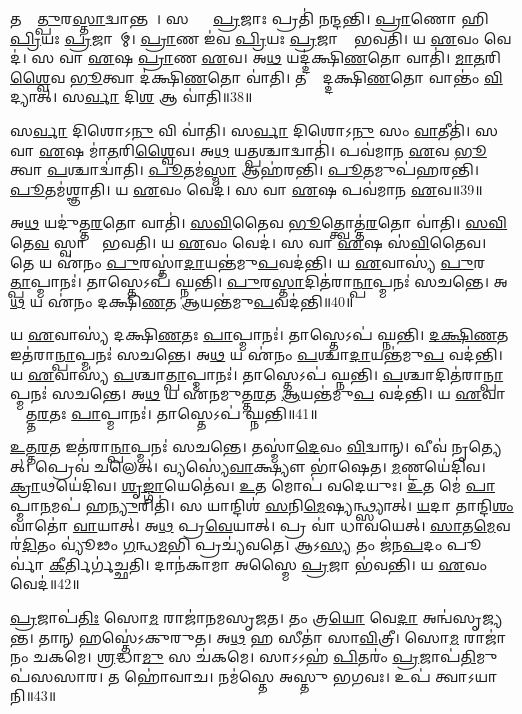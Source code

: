 𑌤𑌸𑍍𑌮𑌾᳚\ul{𑌤𑍍𑌪𑍁}𑌰\ul{𑌸𑍍𑌤𑌾}𑌦𑍍𑌵𑌾𑌨𑍍𑌤𑌮𑍍᳚।
𑌸𑌰𑍍𑌵𑌾𑌃᳚ \ul{𑌪𑍍𑌰}𑌜𑌾𑌃 𑌪𑍍𑌰𑌤𑌿॑ 𑌨𑌨𑍍𑌦𑌨𑍍𑌤𑌿।
\ul{𑌪𑍍𑌰𑌾}𑌣𑍋 𑌹𑌿 \ul{𑌪𑍍𑌰𑌿}𑌯𑌃 \ul{𑌪𑍍𑌰}𑌜𑌾𑌨𑌾᳚𑌮𑍍।
\ul{𑌪𑍍𑌰𑌾}𑌣 𑌇॑𑌵 \ul{𑌪𑍍𑌰𑌿}𑌯𑌃 \ul{𑌪𑍍𑌰}𑌜𑌾𑌨𑌾𑌂᳚ 𑌭𑌵𑌤𑌿।
𑌯 \ul{𑌏}𑌵𑌂 𑌵𑍇𑌦॑।
𑌸 𑌵𑌾 \ul{𑌏}𑌷 \ul{𑌪𑍍𑌰𑌾}𑌣 \ul{𑌏}𑌵।
𑌅\ul{𑌥} 𑌯𑌦𑍍𑌦॑𑌕𑍍𑌷𑌿\ul{𑌣}𑌤𑍋 𑌵𑌾𑌤𑌿॑।
\ul{𑌮𑌾}\ul{𑌤}𑌰𑌿\ul{𑌶𑍍𑌵𑍈}𑌵 \ul{𑌭𑍂}𑌤𑍍𑌵𑌾 𑌦॑𑌕𑍍𑌷𑌿\ul{𑌣}𑌤𑍋 𑌵𑌾॑𑌤𑌿।
𑌤𑌸𑍍𑌮𑌾᳚𑌦𑍍𑌦𑌕𑍍𑌷𑌿\ul{𑌣}𑌤𑍋 𑌵𑌾𑌨𑍍𑌤𑌂॑ \ul{𑌵𑌿}𑌦𑍍𑌯𑌾𑌤𑍍।
𑌸\ul{𑌰𑍍𑌵𑌾} 𑌦𑌿\ul{𑌶} 𑌆 𑌵𑌾॑𑌤𑌿॥38॥

𑌸\ul{𑌰𑍍𑌵𑌾} 𑌦𑌿𑌶𑍋𑌽\ul{𑌨𑍁} 𑌵𑌿 𑌵𑌾॑𑌤𑌿।
𑌸\ul{𑌰𑍍𑌵𑌾} 𑌦𑌿𑌶𑍋𑌽\ul{𑌨𑍁} 𑌸𑌂 \ul{𑌵𑌾}𑌤𑍀𑌤𑌿॑।
𑌸 𑌵𑌾 \ul{𑌏}𑌷 𑌮𑌾॑\ul{𑌤}𑌰𑌿\ul{𑌶𑍍𑌵𑍈}𑌵।
𑌅\ul{𑌥} 𑌯\ul{𑌤𑍍𑌪}𑌶𑍍𑌚𑌾𑌦𑍍𑌵𑌾𑌤𑌿॑।
𑌪𑌵॑𑌮𑌾𑌨 \ul{𑌏}𑌵 \ul{𑌭𑍂}𑌤𑍍𑌵𑌾 \ul{𑌪}𑌶𑍍𑌚𑌾𑌦𑍍𑌵𑌾॑𑌤𑌿।
\ul{𑌪𑍂}𑌤𑌮॑\ul{𑌸𑍍𑌮𑌾} 𑌆𑌹॑𑌰𑌨𑍍𑌤𑌿।
\ul{𑌪𑍂}𑌤𑌮𑍁𑌪॑𑌹𑌰𑌨𑍍𑌤𑌿।
\ul{𑌪𑍂}𑌤𑌮॑𑌶𑍍𑌞𑌾𑌤𑌿।
𑌯 \ul{𑌏}𑌵𑌂 𑌵𑍇𑌦॑।
𑌸 𑌵𑌾 \ul{𑌏}𑌷 𑌪𑌵॑𑌮𑌾𑌨 \ul{𑌏}𑌵॥39॥

𑌅\ul{𑌥} 𑌯𑌦𑍁॑𑌤𑍍𑌤\ul{𑌰}𑌤𑍋 𑌵𑌾𑌤𑌿॑।
\ul{𑌸}\ul{𑌵𑌿}𑌤𑍈𑌵 \ul{𑌭𑍂}𑌤𑍍𑌤𑍍𑌵𑍋𑌤𑍍𑌤॑\ul{𑌰}𑌤𑍋 𑌵𑌾॑𑌤𑌿।
\ul{𑌸}\ul{𑌵𑌿}𑌤𑍇\ul{𑌵} 𑌸𑍍𑌵𑌾𑌨𑌾𑌂᳚ 𑌭𑌵𑌤𑌿।
𑌯 \ul{𑌏}𑌵𑌂 𑌵𑍇𑌦॑।
𑌸 𑌵𑌾 \ul{𑌏}𑌷 𑌸॑\ul{𑌵𑌿}𑌤𑍈𑌵।
𑌤𑍇 𑌯 𑌏॑𑌨𑌂 \ul{𑌪𑍁}𑌰𑌸𑍍𑌤𑌾॑\ul{𑌦𑌾}𑌯𑌨𑍍𑌤॑𑌮𑍁\ul{𑌪}𑌵𑌦॑𑌨𑍍𑌤𑌿।
𑌯 \ul{𑌏}𑌵𑌾𑌸𑍍𑌯॑ \ul{𑌪𑍁}𑌰𑌸𑍍𑌤𑌾᳚\ul{𑌤𑍍𑌪𑌾}𑌪𑍍𑌮𑌾𑌨𑌃॑।
𑌤𑌾𑌸𑍍𑌤𑍇𑌽𑌪॑ 𑌘𑍍𑌨𑌨𑍍𑌤𑌿।
\ul{𑌪𑍁}𑌰\ul{𑌸𑍍𑌤𑌾}𑌦𑌿𑌤॑𑌰𑌾\ul{𑌨𑍍𑌪𑌾}𑌪𑍍𑌮𑌨𑌃॑ 𑌸𑌚𑌨𑍍𑌤𑍇।
𑌅\ul{𑌥} 𑌯 𑌏॑𑌨𑌂 𑌦𑌕𑍍𑌷𑌿\ul{𑌣}𑌤 \ul{𑌆}𑌯𑌨𑍍𑌤॑𑌮𑍁\ul{𑌪}𑌵𑌦॑𑌨𑍍𑌤𑌿॥40॥

𑌯 \ul{𑌏}𑌵𑌾𑌸𑍍𑌯॑ 𑌦𑌕𑍍𑌷𑌿\ul{𑌣}𑌤𑌃 \ul{𑌪𑌾}𑌪𑍍𑌮𑌾𑌨𑌃॑।
𑌤𑌾𑌸𑍍𑌤𑍇𑌽𑌪॑ 𑌘𑍍𑌨𑌨𑍍𑌤𑌿।
\ul{𑌦}\ul{𑌕𑍍𑌷𑌿}\ul{𑌣}𑌤 𑌇𑌤॑𑌰𑌾\ul{𑌨𑍍𑌪𑌾}𑌪𑍍𑌮𑌨𑌃॑ 𑌸𑌚𑌨𑍍𑌤𑍇।
𑌅\ul{𑌥} 𑌯 𑌏॑𑌨𑌂 \ul{𑌪}𑌶𑍍𑌚𑌾\ul{𑌦𑌾}𑌯𑌨𑍍𑌤॑𑌮𑍁\ul{𑌪} 𑌵𑌦॑𑌨𑍍𑌤𑌿।
𑌯 \ul{𑌏}𑌵𑌾𑌸𑍍𑌯॑ \ul{𑌪}𑌶𑍍𑌚𑌾\ul{𑌤𑍍𑌪𑌾}𑌪𑍍𑌮𑌾𑌨𑌃॑।
𑌤𑌾𑌸𑍍𑌤𑍇𑌽𑌪॑ 𑌘𑍍𑌨𑌨𑍍𑌤𑌿।
\ul{𑌪}𑌶𑍍𑌚𑌾𑌦𑌿𑌤॑𑌰𑌾\ul{𑌨𑍍𑌪𑌾}𑌪𑍍𑌮𑌨𑌃॑ 𑌸𑌚𑌨𑍍𑌤𑍇।
𑌅\ul{𑌥} 𑌯 𑌏॑𑌨𑌮𑍁𑌤𑍍𑌤\ul{𑌰}𑌤 \ul{𑌆}𑌯𑌨𑍍𑌤॑𑌮𑍁\ul{𑌪} 𑌵𑌦॑𑌨𑍍𑌤𑌿।
𑌯 \ul{𑌏}𑌵𑌾𑌸𑍍𑌯𑍋᳚𑌤𑍍𑌤\ul{𑌰}𑌤𑌃 \ul{𑌪𑌾}𑌪𑍍𑌮𑌾𑌨𑌃॑।
𑌤𑌾𑌸𑍍𑌤𑍇𑌽𑌪॑ 𑌘𑍍𑌨𑌨𑍍𑌤𑌿॥41॥

\ul{𑌉}\ul{𑌤𑍍𑌤}\ul{𑌰}𑌤 𑌇𑌤॑𑌰𑌾\ul{𑌨𑍍𑌪𑌾}𑌪𑍍𑌮𑌨𑌃॑ 𑌸𑌚𑌨𑍍𑌤𑍇।
𑌤𑌸𑍍𑌮𑌾॑\ul{𑌦𑍇}𑌵𑌂 \ul{𑌵𑌿}𑌦𑍍𑌵𑌾𑌨𑍍।
𑌵𑍀𑌵॑ 𑌨𑍃𑌤𑍍𑌯𑍇𑌤𑍍।
𑌪𑍍𑌰𑍇𑌵॑ 𑌚𑌲𑍇𑌤𑍍।
𑌵𑍍𑌯𑌸𑍍𑌯𑍇॑\ul{𑌵𑌾}𑌕𑍍𑌷𑍍𑌯𑍗 𑌭𑌾॑𑌷𑍇𑌤।
\ul{𑌮}𑌣𑍍𑌟𑌯𑍇॑𑌦𑌿𑌵।
\ul{𑌕𑍍𑌰𑌾}𑌥𑌯𑍇॑𑌦𑌿𑌵।
\ul{𑌶𑍃}\ul{𑌙𑍍𑌗𑌾}𑌯𑍇𑌤𑍇॑𑌵।
\ul{𑌉}𑌤 𑌮𑍋𑌪॑ 𑌵𑌦𑍇𑌯𑍁𑌃।
\ul{𑌉}𑌤 𑌮𑍇॑ \ul{𑌪𑌾}𑌪𑍍𑌮𑌾\ul{𑌨}𑌮𑌪॑ 𑌹\ul{𑌨𑍍𑌯𑍁}𑌰𑌿𑌤𑌿॑।
𑌸 𑌯𑌾𑌨𑍍𑌦𑌿𑌶॑ \ul{𑌸}𑌨𑌿\ul{𑌮𑍇}𑌷𑍍𑌯𑌨𑍍𑌥𑍍𑌸𑍍𑌯𑌾𑌤𑍍।
\ul{𑌯}𑌦𑌾 𑌤𑌾𑌨𑍍𑌦𑌿\ul{𑌶𑌂} 𑌵𑌾𑌤𑍋॑ \ul{𑌵𑌾}𑌯𑌾𑌤𑍍।
𑌅\ul{𑌥} 𑌪𑍍𑌰\ul{𑌵𑍇}𑌯𑌾𑌤𑍍।
𑌪𑍍𑌰 𑌵𑌾॑ 𑌧𑌾𑌵𑌯𑍇𑌤𑍍।
\ul{𑌸𑌾}𑌤\ul{𑌮𑍇}𑌵 𑌰॑\ul{𑌦𑌿}𑌤𑌂 𑌵𑍍𑌯𑍂॑𑌢𑌂 \ul{𑌗}𑌨𑍍𑌧\ul{𑌮}𑌭𑌿 𑌪𑍍𑌰𑌚𑍍𑌯॑𑌵𑌤𑍇।
𑌆𑌽\ul{𑌸𑍍𑌯} 𑌤𑌂 𑌜॑𑌨\ul{𑌪}𑌦𑌂 𑌪𑍂𑌰𑍍𑌵𑌾॑ \ul{𑌕𑍀}𑌰𑍍𑌤𑌿𑌰𑍍𑌗॑𑌚𑍍𑌛𑌤𑌿।
𑌦𑌾𑌨॑𑌕𑌾𑌮𑌾 𑌅𑌸𑍍𑌮𑍈 \ul{𑌪𑍍𑌰}𑌜𑌾 𑌭॑𑌵𑌨𑍍𑌤𑌿।
𑌯 \ul{𑌏}𑌵𑌂 𑌵𑍇𑌦॑॥42॥\anuvakamend[𑌵𑍇\ul{𑌦} 𑌸𑌮𑍍𑌪॑𑌵𑌤 𑌆\ul{𑌦𑌿}𑌤𑍍𑌯𑌾𑌤𑍍𑌪॑𑌵𑌤𑍇 \ul{𑌵𑌾}𑌤𑍍𑌯𑌾 𑌵𑌾᳚\ul{𑌤𑍍𑌯𑍇}𑌷 𑌪𑌵॑𑌮𑌾𑌨 \ul{𑌏}𑌵 𑌦॑𑌕𑍍𑌷𑌿\ul{𑌣}𑌤 \ul{𑌆}𑌯𑌨𑍍𑌤॑𑌮𑍁\ul{𑌪} 𑌵𑌦॑𑌨𑍍𑌤𑍍𑌯𑍁𑌤𑍍𑌤\ul{𑌰}𑌤𑌃 \ul{𑌪𑌾}𑌪𑍍𑌮𑌾\ul{𑌨}𑌸𑍍𑌤𑌾\dng{ꣴ} 𑌸𑍍𑌤𑍇𑌪॑ \ul{𑌘𑍍𑌨}𑌨𑍍𑌤𑍀\ul{𑌤𑍍𑌯}𑌷𑍍𑌟𑍗 𑌚॑]

\ul{𑌪𑍍𑌰}𑌜𑌾𑌪॑\ul{𑌤𑌿𑌃} 𑌸𑍋\ul{𑌮}\ul{} 𑌰𑌾𑌜𑌾॑𑌨𑌮𑌸𑍃𑌜𑌤।
𑌤𑌂 𑌤𑍍𑌰\ul{𑌯𑍋} 𑌵𑍇\ul{𑌦𑌾} 𑌅𑌨𑍍𑌵॑𑌸𑍃𑌜𑍍𑌯𑌨𑍍𑌤।
𑌤𑌾𑌨𑍍 𑌹𑌸𑍍𑌤𑍇॑\-𑌽𑌕𑍁𑌰𑍁𑌤।
𑌅\ul{𑌥} 𑌹 𑌸𑍀𑌤𑌾॑ 𑌸𑌾\ul{𑌵𑌿}𑌤𑍍𑌰𑍀।
𑌸𑍋\ul{𑌮}\ul{} 𑌰𑌾𑌜𑌾॑𑌨𑌂 𑌚𑌕𑌮𑍇।
\ul{𑌶𑍍𑌰}𑌦𑍍𑌧𑌾\ul{𑌮𑍁} 𑌸 𑌚॑𑌕𑌮𑍇।
𑌸𑌾𑌽𑌽𑌹॑ \ul{𑌪𑌿}𑌤𑌰𑌂॑ \ul{𑌪𑍍𑌰}𑌜𑌾𑌪॑\ul{𑌤𑌿}𑌮𑍁𑌪॑𑌸𑌸𑌾𑌰।
𑌤 𑌹𑍋॑𑌵𑌾𑌚।
𑌨𑌮॑𑌸𑍍𑌤𑍇 𑌅𑌸𑍍𑌤𑍁 𑌭𑌗𑌵𑌃।
𑌉𑌪॑ 𑌤𑍍𑌵𑌾\-𑌽𑌯𑌾𑌨𑌿॥43॥

